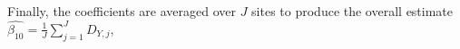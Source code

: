 Finally, the coefficients are averaged over $J$ sites to produce the overall estimate $\hat{\beta_{10}}=\frac{1}{J} \sum_{j=1}^J D_{Y,j}$,